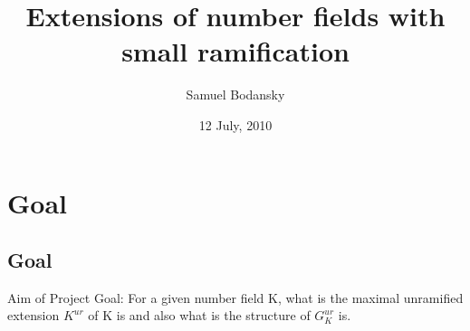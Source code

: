 \documentclass[10pt]{beamer}
\title[Part C Dissertation] %
{Extensions of number fields with small ramification}
\subtitle
{}
\author %
{Samuel Bodansky}
\institute %
{
  University of Oxford
  }
\date %
{12 July, 2010}
\begin{document}
\begin{frame}
  \titlepage
\end{frame}







\section{Goal}
\subsection{Goal}
\begin{frame}{Aim of Project}
Goal: For a given number field K, what is the maximal unramified extension $K^{ur}$ of K is and also what is the structure of $G_K^{ur}$ is.


\end{frame}
\end{document}
